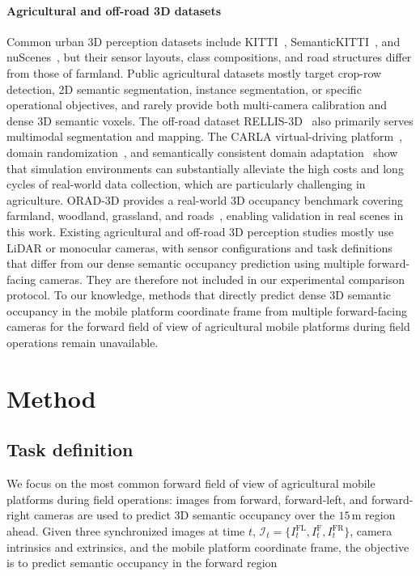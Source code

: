 \documentclass[a4paper,fleqn]{cas-sc}
\newcommand{\I}{\mathcal{I}}
\begin{document}
\paragraph{Agricultural and off-road 3D datasets}
Common urban 3D perception datasets include KITTI~\citep{geiger2012kitti}, SemanticKITTI~\citep{behley2019semantickitti}, and nuScenes~\citep{caesar2020nuscenes}, but their sensor layouts, class compositions, and road structures differ from those of farmland.
Public agricultural datasets mostly target crop-row detection, 2D semantic segmentation, instance segmentation, or specific operational objectives, and rarely provide both multi-camera calibration and dense 3D semantic voxels. The off-road dataset RELLIS-3D~\citep{jiang2020rellis} also primarily serves multimodal segmentation and mapping.
The CARLA virtual-driving platform~\citep{dosovitskiy2017carla}, domain randomization~\citep{tobin2017domainrandomization,peng2018sim2real}, and semantically consistent domain adaptation~\citep{hoffman2018cycada} show that simulation environments can substantially alleviate the high costs and long cycles of real-world data collection, which are particularly challenging in agriculture.
ORAD-3D provides a real-world 3D occupancy benchmark covering farmland, woodland, grassland, and roads~\citep{chen2025orad3d}, enabling validation in real scenes in this work.
Existing agricultural and off-road 3D perception studies mostly use LiDAR or monocular cameras, with sensor configurations and task definitions that differ from our dense semantic occupancy prediction using multiple forward-facing cameras. They are therefore not included in our experimental comparison protocol. To our knowledge, methods that directly predict dense 3D semantic occupancy in the mobile platform coordinate frame from multiple forward-facing cameras for the forward field of view of agricultural mobile platforms during field operations remain unavailable.

\section{Method}\label{sec:method}

\subsection{Task definition}\label{sec:task}
We focus on the most common forward field of view of agricultural mobile platforms during field operations: images from forward, forward-left, and forward-right cameras are used to predict 3D semantic occupancy over the $15\,$m region ahead.
Given three synchronized images at time $t$, $\I_t=\{I_t^{\mathrm{FL}},I_t^{\mathrm{F}},I_t^{\mathrm{FR}}\}$, camera intrinsics and extrinsics, and the mobile platform coordinate frame, the objective is to predict semantic occupancy in the forward region
\end{document}
